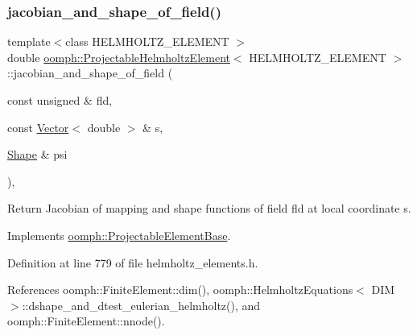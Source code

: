 \mbox{\label{classoomph_1_1ProjectableHelmholtzElement_a651580abfd2d133f7cd6cd38e0bcca61}} 
\subsubsection{\texorpdfstring{jacobian\+\_\+and\+\_\+shape\+\_\+of\+\_\+field()}{jacobian\_and\_shape\_of\_field()}}
{\footnotesize\ttfamily template$<$class H\+E\+L\+M\+H\+O\+L\+T\+Z\+\_\+\+E\+L\+E\+M\+E\+NT $>$ \\
double \hyperlink{classoomph_1_1ProjectableHelmholtzElement}{oomph\+::\+Projectable\+Helmholtz\+Element}$<$ H\+E\+L\+M\+H\+O\+L\+T\+Z\+\_\+\+E\+L\+E\+M\+E\+NT $>$\+::jacobian\+\_\+and\+\_\+shape\+\_\+of\+\_\+field (\begin{DoxyParamCaption}\item[{const unsigned \&}]{fld,  }\item[{const \hyperlink{classoomph_1_1Vector}{Vector}$<$ double $>$ \&}]{s,  }\item[{\hyperlink{classoomph_1_1Shape}{Shape} \&}]{psi }\end{DoxyParamCaption})\hspace{0.3cm}{\ttfamily [inline]}, {\ttfamily [virtual]}}



Return Jacobian of mapping and shape functions of field fld at local coordinate s. 



Implements \hyperlink{classoomph_1_1ProjectableElementBase_ad45c21b58c0985d52f68ab2d79cbb488}{oomph\+::\+Projectable\+Element\+Base}.



Definition at line 779 of file helmholtz\+\_\+elements.\+h.



References oomph\+::\+Finite\+Element\+::dim(), oomph\+::\+Helmholtz\+Equations$<$ D\+I\+M $>$\+::dshape\+\_\+and\+\_\+dtest\+\_\+eulerian\+\_\+helmholtz(), and oomph\+::\+Finite\+Element\+::nnode().

\mbox{\label{classoomph_1_1ProjectableHelmholtzElement_ada5e8cc58f2c0be72da7b66e07d174be}} 
